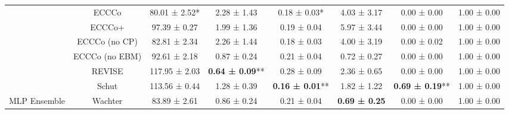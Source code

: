 \begin{table}
{\begin{tabular}[t]{cccccccc}
 & ECCCo & 80.01 ± 2.52*\hphantom{*} & 2.28 ± 1.43\hphantom{*}\hphantom{*} & 0.18 ± 0.03*\hphantom{*} & 4.03 ± 3.17\hphantom{*}\hphantom{*} & 0.00 ± 0.00\hphantom{*}\hphantom{*} & 1.00 ± 0.00\hphantom{*}\hphantom{*}\\

 & ECCCo+ & 97.39 ± 0.27\hphantom{*}\hphantom{*} & 1.99 ± 1.36\hphantom{*}\hphantom{*} & 0.19 ± 0.04\hphantom{*}\hphantom{*} & 5.97 ± 3.44\hphantom{*}\hphantom{*} & 0.00 ± 0.00\hphantom{*}\hphantom{*} & 1.00 ± 0.00\hphantom{*}\hphantom{*}\\

 & ECCCo (no CP) & 82.81 ± 2.34\hphantom{*}\hphantom{*} & 2.26 ± 1.44\hphantom{*}\hphantom{*} & 0.18 ± 0.03\hphantom{*}\hphantom{*} & 4.00 ± 3.19\hphantom{*}\hphantom{*} & 0.00 ± 0.02\hphantom{*}\hphantom{*} & 1.00 ± 0.00\hphantom{*}\hphantom{*}\\

 & ECCCo (no EBM) & 92.61 ± 2.18\hphantom{*}\hphantom{*} & 0.87 ± 0.24\hphantom{*}\hphantom{*} & 0.21 ± 0.04\hphantom{*}\hphantom{*} & 0.72 ± 0.27\hphantom{*}\hphantom{*} & 0.00 ± 0.00\hphantom{*}\hphantom{*} & 1.00 ± 0.00\hphantom{*}\hphantom{*}\\

 & REVISE & 117.95 ± 2.03\hphantom{*}\hphantom{*} & \textbf{0.64 ± 0.09}** & 0.28 ± 0.09\hphantom{*}\hphantom{*} & 2.36 ± 0.65\hphantom{*}\hphantom{*} & 0.00 ± 0.00\hphantom{*}\hphantom{*} & 1.00 ± 0.00\hphantom{*}\hphantom{*}\\

 & Schut & 113.56 ± 0.44\hphantom{*}\hphantom{*} & 1.28 ± 0.39\hphantom{*}\hphantom{*} & \textbf{0.16 ± 0.01}** & 1.82 ± 1.22\hphantom{*}\hphantom{*} & \textbf{0.69 ± 0.19}** & 1.00 ± 0.00\hphantom{*}\hphantom{*}\\

\multirow[t]{-10}{*}{\centering\arraybackslash MLP Ensemble} & Wachter & 83.89 ± 2.61\hphantom{*}\hphantom{*} & 0.86 ± 0.24\hphantom{*}\hphantom{*} & 0.21 ± 0.04\hphantom{*}\hphantom{*} & \textbf{0.69 ± 0.25}\hphantom{*}\hphantom{*} & 0.00 ± 0.00\hphantom{*}\hphantom{*} & 1.00 ± 0.00\hphantom{*}\hphantom{*}\\
\bottomrule
\end{tabular}}
\end{table}

